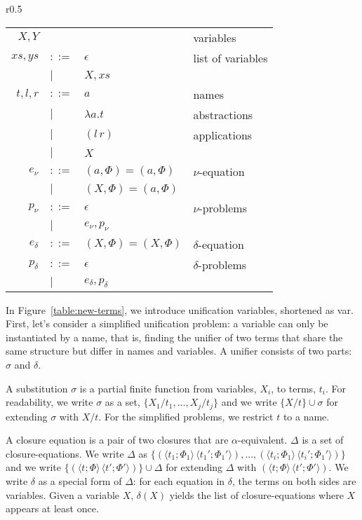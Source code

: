 \documentclass[a4paper,UKenglish]{lipics-v2016}
\newcommand{\clos}[2] {
  \langle #1; #2 \rangle
}
\newcommand{\app}[2] {
  (#1\, #2)
}
\newcommand{\pr}[2] {
 (#1\, #2)
}
\newcommand{\bd}[2] {
 #1/ #2
}
\begin{document}
\label{unify}
\begin{wrapfigure}{r}{0.5\textwidth}
  \caption{Unification terms and problems\label{table:new-terms}}
    \begin{tabular}{r l l l}  
    $X,Y$   &       &     & variables \\
      $xs,ys$ & $::=$ & $\epsilon$& list of variables \\
      & $|$&  $X,xs$ &  \\
    $t,l,r$ & $::=$ & $a$ & names \\
    & $|$ & $\lambda a.t$ & abstractions \\
    & $|$ & $\app{l}{r}$ & applications \\
      & $|$ & $X$ & \\
      $e_\nu$  & $::=$ & $(a,\Phi) = (a,\Phi)$ & $\nu$-equation \\
           & $|$ &  $(X,\Phi) = (a,\Phi)$ \\
      $p_\nu$  & $::=$ & $\epsilon$ & $\nu$-problems \\
           & $|$ & $e_\nu, p_\nu$ \\
      $e_\delta$  & $::=$& $(X,\Phi) = (X,\Phi)$ & $\delta$-equation \\
      $p_\delta$  & $::=$ & $\epsilon$ & $\delta$-problems \\
           & $|$ & $e_\delta, p_\delta$
    \end{tabular}
\end{wrapfigure}

In Figure~\ref{table:new-terms}, we introduce unification variables,
shortened as var.  First, let's consider a simplified unification
problem: a variable can only be instantiated by a name, that is,
finding the unifier of two terms that share the same structure but
differ in names and variables.  A unifier consists of two parts:
$\sigma$ and $\delta$.
\begin{definition}
  A substitution $\sigma$ is a partial finite function from variables,
  $X_i$, to terms, $t_i$.  For readability, we write $\sigma$ as a
  set, $\{\bd{X_1}{t_1}, ..., \bd{X_j}{t_j}\}$ and we write
  $\{\bd{X}{t}\} \cup \sigma$ for extending $\sigma$ with $\bd{X}{t}$.
  For the simplified problems, we restrict $t$ to a name.
\end{definition}

\begin{definition}
  A closure equation is a pair of two closures that are
  $\alpha$-equivalent.  $\Delta$ is a set of closure-equations.  We
  write $\Delta$ as $\{\pr{\clos{t_1}{\Phi_1}}{\clos{t_1'}{\Phi_1'}},
  ..., \pr{\clos{t_i}{\Phi_1}}{\clos{t_i'}{\Phi_1'}}\}$ and we write
  $\{\pr{\clos{t}{\Phi}}{\clos{t'}{\Phi'}}\}\cup\Delta$ for extending
  $\Delta$ with $\pr{\clos{t}{\Phi}}{\clos{t'}{\Phi'}}$.  We write
  $\delta$ as a special form of $\Delta$: for each equation in
  $\delta$, the terms on both sides are variables.
  {\color{red}}
  Given a variable
  $X$, $\delta(X)$ yields the list of
  closure-equations where $X$ appears at least once.
\end{definition}
\end{document}

